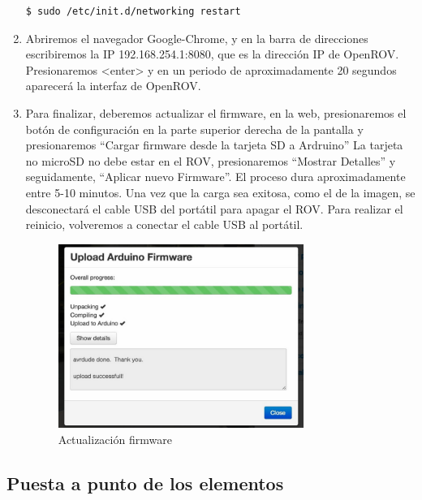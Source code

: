 \begin{enumerate}
\renewcommand{\lstlistingname}{}
\begin{lstlisting}[caption=Reinicio, label={lst:reset}]
  $ sudo /etc/init.d/networking restart
\end{lstlisting}
\item Abriremos el navegador Google-Chrome, y en la barra de direcciones escribiremos la IP 192.168.254.1:8080, que es la dirección IP de OpenROV. Presionaremos <enter> y en un periodo de aproximadamente 20 segundos aparecerá la interfaz de OpenROV.
\item Para finalizar, deberemos actualizar el firmware, en la web, presionaremos el botón de configuración en la parte superior derecha de la pantalla y presionaremos “Cargar firmware desde la tarjeta SD a Ardruino”
La tarjeta no microSD no debe estar en el ROV, presionaremos “Mostrar Detalles” y seguidamente, “Aplicar nuevo Firmware”.
El proceso dura aproximadamente entre 5-10 minutos.
Una vez que la carga sea exitosa, como el de la imagen, se desconectará el cable USB del portátil para apagar el ROV. Para realizar el reinicio, volveremos a conectar el cable USB al portátil.


\begin{figure} [hbtp]
\begin{center}
  \includegraphics[width=8cm]{img/cap3/3_4/firmware}
\end{center}
\caption{Actualización firmware}
\label{fig:firmware}
\end{figure}

\end{enumerate}
  
  
  
\subsection{Puesta a punto de los elementos}
\label{subsec:elementos}

